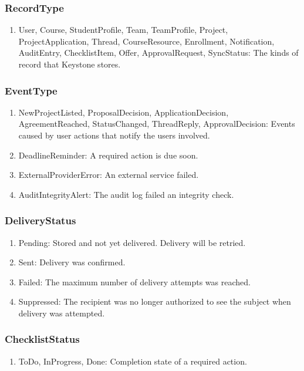 \documentclass[12pt, titlepage]{article}
\begin{document}
\subsubsection{RecordType}
\begin{enumerate}
    \item User, Course, StudentProfile, Team, TeamProfile, Project, ProjectApplication,
    Thread, CourseResource, Enrollment, Notification, AuditEntry, ChecklistItem,
    Offer, ApprovalRequest, SyncStatus: The kinds of record that Keystone stores.
\end{enumerate}

\subsubsection{EventType}
\begin{enumerate}
    \item NewProjectListed, ProposalDecision, ApplicationDecision, AgreementReached,
    StatusChanged, ThreadReply, ApprovalDecision: Events caused by user actions that notify the users involved.
    \item DeadlineReminder: A required action is due soon.
    \item ExternalProviderError: An external service failed.
    \item AuditIntegrityAlert: The audit log failed an integrity check.
\end{enumerate}

\subsubsection{DeliveryStatus}
\begin{enumerate}
    \item Pending: Stored and not yet delivered. Delivery will be retried.
    \item Sent: Delivery was confirmed.
    \item Failed: The maximum number of delivery attempts was reached.
    \item Suppressed: The recipient was no longer authorized to see the subject when delivery was attempted.
\end{enumerate}

\subsubsection{ChecklistStatus}
\begin{enumerate}
    \item ToDo, InProgress, Done: Completion state of a required action.
\end{enumerate}
\end{document}
